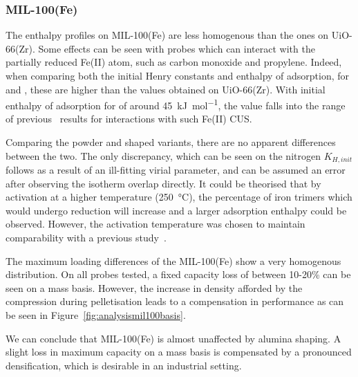 \subsubsection{MIL-100(Fe)}

The enthalpy profiles on MIL-100(Fe) are less homogenous than the ones on UiO-66(Zr). 
Some effects can
be seen with probes which can interact with the partially reduced Fe(II) atom, such as 
carbon monoxide and propylene. 
Indeed, when comparing both the initial Henry constants and enthalpy of adsorption,
for  and , these are higher than the values obtained on UiO-66(Zr).
With initial enthalpy of adsorption for  of around \SI{45}{\kilo\joule\per\mol},
the value falls into the range of previous~\cite{yoonControlledReducibilityMetalOrganic2010}
results for interactions with such Fe(II) CUS.

Comparing the powder and shaped variants, there are no 
apparent differences between the two. The only discrepancy, which can be seen on the 
nitrogen \(K_{H, init}\) follows as a result of an ill-fitting virial parameter,
and can be assumed an error after observing the isotherm overlap directly. It could be 
theorised that by activation at a higher temperature (\SI{250}{\degreeCelsius}),
the percentage of iron trimers which would undergo reduction will increase and 
a larger adsorption enthalpy could be observed. However, the
activation temperature was chosen to maintain comparability with a previous 
study~\cite{chanutObservingEffectsShaping2016}.

The maximum loading differences of the MIL-100(Fe) show a very homogenous distribution.
On all probes tested, a fixed capacity loss of between 10-20\% can be seen on a mass 
basis. However, the increase in density afforded by the compression during pelletisation
leads to a compensation in performance as can be seen in Figure~\ref{fig:analysismil100basis}.

We can conclude that MIL-100(Fe) is almost unaffected by alumina shaping. A slight loss
in maximum capacity on a mass basis is compensated by a pronounced densification, 
which is desirable in an industrial setting.


